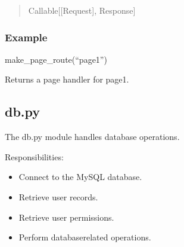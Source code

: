 \documentclass[letterpaper,10pt,english]{sphinxmanual}
\begin{document}
\begin{fulllineitems}
\begin{quote}
\begin{description}
\sphinxAtStartPar
Callable{[}{[}Request{]}, Response{]}

\end{description}\end{quote}
\subsubsection*{Example}

\sphinxAtStartPar
make\_page\_route(“page1”)

\sphinxAtStartPar
Returns a page handler for page1.

\end{fulllineitems}



\subsection{db.py}
\label{\detokenize{modules:db-py}}
\sphinxAtStartPar
The db.py module handles database operations.

\sphinxAtStartPar
Responsibilities:
\begin{itemize}
\item {} 
\sphinxAtStartPar
Connect to the MySQL database.

\item {} 
\sphinxAtStartPar
Retrieve user records.

\item {} 
\sphinxAtStartPar
Retrieve user permissions.

\item {} 
\sphinxAtStartPar
Perform database\sphinxhyphen{}related operations.

\end{itemize}

\sphinxAtStartPar
{}

\begin{sphinxVerbatim}[commandchars=\\\{\}]
 

  
  
 
\end{sphinxVerbatim}
\end{document}
